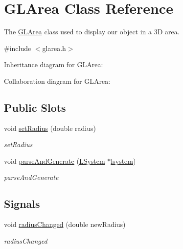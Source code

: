 \hypertarget{classGLArea}{}\section{G\+L\+Area Class Reference}
\label{classGLArea}


The \hyperlink{classGLArea}{G\+L\+Area} class used to display our object in a 3D area.  




{\ttfamily \#include $<$glarea.\+h$>$}



Inheritance diagram for G\+L\+Area\+:


Collaboration diagram for G\+L\+Area\+:
\subsection*{Public Slots}
\begin{DoxyCompactItemize}
\item 
void \hyperlink{classGLArea_adc0925522aef672674532556f275a573}{set\+Radius} (double radius)
\begin{DoxyCompactList}\small\item\em set\+Radius \end{DoxyCompactList}\item 
void \hyperlink{classGLArea_a9a09b4b0282edd1ab833ae7b676260de}{parse\+And\+Generate} (\hyperlink{classLSystem}{L\+System} $\ast$\hyperlink{classGLArea_a6ee532e8c421415c438976fe2bfca6ce}{lsystem})
\begin{DoxyCompactList}\small\item\em parse\+And\+Generate \end{DoxyCompactList}\end{DoxyCompactItemize}
\subsection*{Signals}
\begin{DoxyCompactItemize}
\item 
void \hyperlink{classGLArea_a814e5294e79165efc0878718c72db9f6}{radius\+Changed} (double new\+Radius)
\begin{DoxyCompactList}\small\item\em radius\+Changed \end{DoxyCompactList}\end{DoxyCompactItemize}
